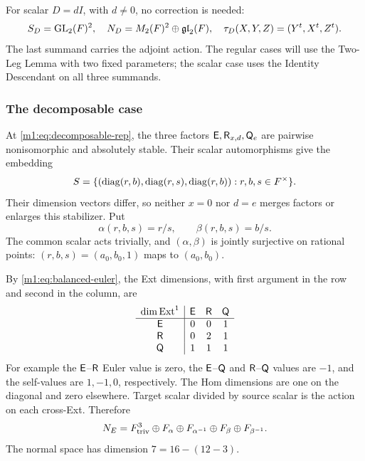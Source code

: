 For scalar $D=dI$, with $d\neq0$, no correction is needed:
\begin{equation}\label{m1:eq:rankzero-scalar}
 S_D=\operatorname{GL}_2(F)^2,\quad N_D=M_2(F)^2\oplus\mathfrak{gl}_2(F),\quad
 \tau_D(X,Y,Z)=(Y^t,X^t,Z^t).
\end{equation}
The last summand carries the adjoint action. The
regular cases will use the Two-Leg Lemma with two fixed parameters;
the scalar case uses the Identity Descendant on all three summands.

\subsubsection{The decomposable case}\label{m1:subsec:decomposable-normal}
At \eqref{m1:eq:decomposable-rep}, the three factors
$\mathsf E,\mathsf R_{x,d},\mathsf Q_e$ are pairwise nonisomorphic and absolutely
stable. Their scalar automorphisms give the embedding
\begin{equation}\label{m1:eq:decomposable-stabilizer}
 S=\{(\operatorname{diag}(r,b),\operatorname{diag}(r,s),\operatorname{diag}(r,b)):r,b,s\in F^\times\}.
\end{equation}
Their dimension vectors differ, so neither $x=0$ nor $d=e$ merges
factors or enlarges this stabilizer. Put
\begin{equation}\label{m1:eq:decomposable-characters}
 \alpha(r,b,s)=r/s,\qquad\beta(r,b,s)=b/s.
\end{equation}
The common scalar acts trivially, and $(\alpha,\beta)$ is jointly
surjective on rational points: $(r,b,s)=(a_0,b_0,1)$ maps to
$(a_0,b_0)$.

By \eqref{m1:eq:balanced-euler}, the Ext dimensions, with first argument
in the row and second in the column, are
\begin{equation}\label{m1:eq:decomposable-ext-table}
 \begin{array}{c|ccc}
 \dim\operatorname{Ext}^1&\mathsf E&\mathsf R&\mathsf Q\\\hline
 \mathsf E&0&0&1\\
 \mathsf R&0&2&1\\
 \mathsf Q&1&1&1
 \end{array}
\end{equation}
For example the $\mathsf E$--$\mathsf R$ Euler value is zero, the
$\mathsf E$--$\mathsf Q$ and $\mathsf R$--$\mathsf Q$ values are $-1$, and the
self-values are $1,-1,0$, respectively. The Hom dimensions are one
on the diagonal and zero elsewhere. Target scalar divided by source
scalar is the action on each cross-Ext. Therefore
\begin{equation}\label{m1:eq:decomposable-normal}
 N_E=F^3_{\mathrm{triv}}\oplus F_\alpha\oplus F_{\alpha^{-1}}
                  \oplus F_\beta\oplus F_{\beta^{-1}}.
\end{equation}
The normal space has dimension $7=16-(12-3)$.


